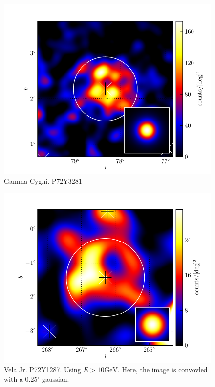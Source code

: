 \documentclass[preprint]{aastex}
\newcommand{\gev}{\text{GeV}\xspace}
\renewcommand{\deg}{\ensuremath{^\circ}\xspace}
\begin{document}
\begin{figure}
  \begin{center}
    \includegraphics[type=pdf,ext=.pdf,read=.pdf]{source_plots/source_Gamma_Cygni}
  \end{center}
  \caption{
  Gamma Cygni. P72Y3281
  }\label{Gamma_Cygni}
\end{figure}

\begin{figure}
  \begin{center}
    \includegraphics[type=pdf,ext=.pdf,read=.pdf]{source_plots/source_Vela_Jr}
  \end{center}
  \caption{Vela Jr. P72Y1287. Using $E>10\gev$. Here, the image is
  convovled with a $0.25\deg$ gaussian.
  }\label{Vela_Jr}
\end{figure}
\end{document}
